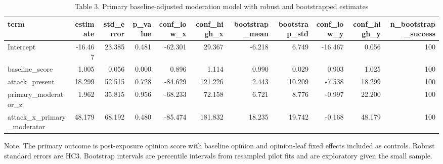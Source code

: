 \begin{table}[htbp]
\centering
\begin{threeparttable}
\caption{Table 3. Primary baseline-adjusted moderation model with robust and bootstrapped estimates}
\label{tab:primary_model}
\small
\begin{tabular}{lrrrrrrrrrr}
\toprule
term & estimate & std\_error & p\_value & conf\_low\_x & conf\_high\_x & bootstrap\_mean & bootstrap\_std & conf\_low\_y & conf\_high\_y & n\_bootstrap\_success \\
\midrule
Intercept & -16.467 & 23.385 & 0.481 & -62.301 & 29.367 & -6.218 & 6.749 & -16.467 & 0.056 & 100 \\
baseline\_score & 1.005 & 0.056 & 0.000 & 0.896 & 1.114 & 0.990 & 0.029 & 0.903 & 1.025 & 100 \\
attack\_present & 18.299 & 52.515 & 0.728 & -84.629 & 121.226 & 2.443 & 10.209 & -7.538 & 18.299 & 100 \\
primary\_moderator\_z & 1.962 & 35.815 & 0.956 & -68.233 & 72.158 & 6.721 & 8.776 & -0.997 & 22.200 & 100 \\
attack\_x\_primary\_moderator & 48.179 & 68.192 & 0.480 & -85.474 & 181.832 & 18.235 & 19.742 & -0.168 & 48.179 & 100 \\
\bottomrule
\end{tabular}

\begin{tablenotes}[flushleft]\footnotesize\item Note. The primary outcome is post-exposure opinion score with baseline opinion and opinion-leaf fixed effects included as controls. Robust standard errors are HC3. Bootstrap intervals are percentile intervals from resampled pilot fits and are exploratory given the small sample.\end{tablenotes}
\end{threeparttable}
\end{table}